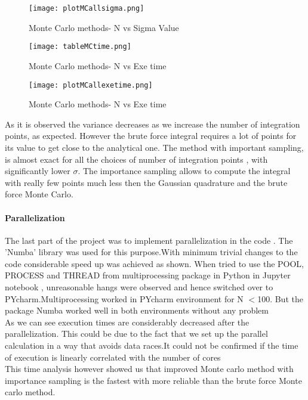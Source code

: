 \documentclass[9pt,a4paper,titlepage]{article}
\begin{document}
\begin{figure}[H]
  \texttt{[image: plotMCallsigma.png]}
  \caption{Monte Carlo methods- N vs Sigma Value}
  \label{fig:MCrelerr}
\end{figure}

\newpage

\begin{figure}[H]
  \texttt{[image: tableMCtime.png]}
  \caption{Monte Carlo methods- N vs Exe time}
  \label{fig:MCtime}
\end{figure}


\begin{figure}[H]
  \texttt{[image: plotMCallexetime.png]}
  \caption{Monte Carlo methods- N vs Exe time}
  \label{fig:MCtime}
\end{figure}

As it is observed  the variance decreases as we increase the number of integration points, as expected. However the brute force integral requires a lot of points for its value to get close to the analytical one.
The method with important sampling, is almost exact for all the choices of number of integration points , with significantly lower $\sigma$. The importance sampling allows to compute the integral with really few points much less then the Gaussian quadrature and the brute force Monte Carlo. 

\paragraph{Parallelization} The last part of the  project was to implement parallelization in the  code . The 'Numba' library  was used  for this purpose.With minimum trivial changes to the code  considerable speed up was achieved as shown.
When tried to use the POOL, PROCESS and THREAD from  multiprocessing package in Python in Jupyter notebook , unreasonable hangs were observed and hence switched over to PYcharm.Multiprocessing worked in PYcharm environment for N $<$100. 
But the package Numba worked well in both environments without any problem 
\\
As we can see execution  times are considerably decreased after the parallelization. This could be due to the fact that we set up the parallel calculation in a way that avoids data races.It could not be confirmed if  the time of execution is  linearly correlated with the number of cores
\\
This time analysis however showed us  that improved Monte carlo method with importance sampling is the fastest with more reliable than the brute force Monte carlo method. 
\end{document}
